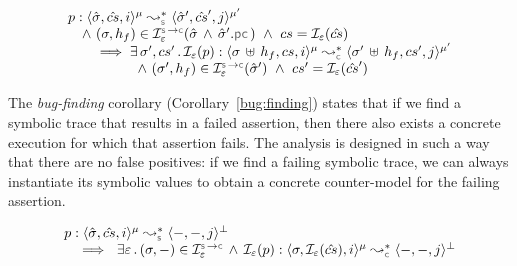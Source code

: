 \vspace*{-0.1cm}
\begin{theorem}\label{teo:soundness:jsil:symb:exe}
$$
\begin{array}{l}
\prog : \transabssemrule{\sstate, \scs, i}{\sstate', \scs', j}{\mode}{\mode'}{\symbolic} 
    \\ \quad \wedge \ (\jstate, \heap_f) \in \interpret{\symbconc}{\senv}(\sstate \, \wedge \, \sstate'.\pcsel) \ \wedge \ \cs = \shorthand(\scs) \\ \qquad \implies \exists \, \jstate', \cs' \, . \,
        \shorthand(\prog) : \transabssemrule{\jstate \dunion \heap_f, \cs, i}{\jstate' \dunion \heap_f, \cs', j}{\mode}{\mode'}{\concrete} \\ \qquad \qquad \quad
               \wedge \ (\jstate', \heap_f) \in \interpret{\symbconc}{\senv}(\sstate')
               \ \wedge \ \cs' = \shorthand(\scs')
\end{array}
$$
\end{theorem}

The \emph{bug-finding} corollary (Corollary~\ref{bug:finding}) states that if 
we find a symbolic trace that results in a failed assertion, 
then there also exists a concrete execution for which that assertion fails.
The analysis is designed in such a way that there are no false positives: 
if we find a failing symbolic trace,
we can always instantiate its symbolic values to obtain a concrete counter-model for the 
failing assertion. %

\vspace*{-0.1cm}
\begin{corollary}\label{bug:finding}
$$
\begin{array}{l}
\prog : \transabssemrule{\sstate, \scs, i}{-, -, j}{\mode}{\bot}{\symbolic}  \\ \quad  
%
   \implies \  \exists \senv \, . \, (\jstate, -) \in \interpret{\symbconc}{\senv} \, \wedge \, 
          \shorthand(\prog) :  \transabssemrule{\jstate, \shorthand(\scs), i}{-, -, j}{\mode}{\bot}{\concrete} 
\end{array}
$$
\end{corollary}

